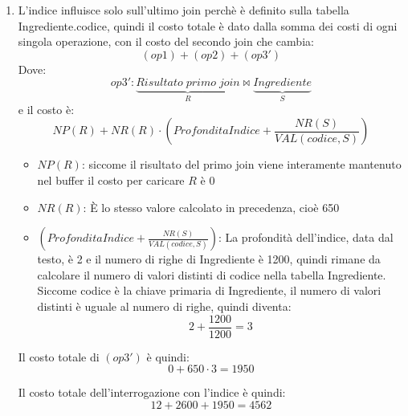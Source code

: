 \documentclass[a4paper]{article}
\begin{document}
\begin{exercise}
\begin{enumerate}
    \item L'indice influisce solo sull'ultimo join perchè è definito sulla tabella
      Ingrediente.codice, quindi il costo totale è dato dalla somma dei costi
      di ogni singola operazione, con il costo del secondo join che cambia:
      \[
        (op1) + (op2) + (op3')
      \] 
      Dove:
      \[
        op3': \underbrace{Risultato\;primo\;join}_R \bowtie
            \underbrace{Ingrediente}_{S}
      \] 
      e il costo è:
      \[
        NP(R) + NR(R) \cdot \left( ProfonditaIndice + \frac{NR(S)}{VAL(codice, S)} \right)
      \] 
      \begin{itemize}
        \item \( NP(R) \): siccome il risultato del primo join viene
          interamente mantenuto nel buffer il costo per caricare \( R \) 
          è 0

        \item \( NR(R) \): È lo stesso valore calcolato in precedenza, cioè 650

        \item \( \left( ProfonditaIndice + \frac{NR(S)}{VAL(codice, S)} \right) \):
          La profondità dell'indice, data dal testo, è 2 e il numero di righe
          di Ingrediente è 1200, quindi rimane da calcolare il numero di valori distinti
          di codice nella tabella Ingrediente. Siccome codice è la chiave primaria
          di Ingrediente, il numero di valori distinti è uguale al numero di righe,
          quindi diventa:
          \[
            2 + \frac{1200}{1200} = 3
          \] 
      \end{itemize}
      Il costo totale di \( (op3') \) è quindi:
      \[
        0 + 650 \cdot 3 = 1950
      \] 

      \vspace{1em}
      \noindent
      Il costo totale dell'interrogazione con l'indice è quindi:
      \[
        12 + 2600 + 1950 = 4562
      \] 
  \end{enumerate}
\end{exercise}
\end{document}
